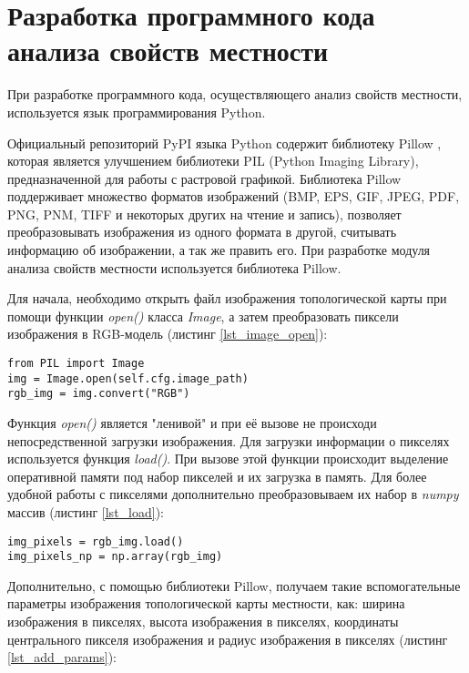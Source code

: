 \section{Разработка программного кода анализа свойств местности}

При разработке программного кода, осуществляющего анализ свойств местности, используется язык программирования Python. 

Официальный репозиторий PyPI языка Python содержит библиотеку Pillow \cite{pillow}, которая является улучшением 
библиотеки PIL (Python Imaging Library), предназначенной для работы с растровой графикой. Библиотека Pillow 
поддерживает множество форматов изображений (BMP, EPS, GIF, JPEG, PDF, PNG, PNM, TIFF и некоторых других на чтение и 
запись), позволяет преобразовывать изображения из одного формата в другой, считывать информацию об изображении, а так 
же править его. При разработке модуля анализа свойств местности используется библиотека Pillow.

Для начала, необходимо открыть файл изображения топологической карты при помощи функции \textit{open()} класса 
\textit{Image}, а затем преобразовать пиксели изображения в RGB-модель (листинг \ref{lst_image_open}):

\begin{lstlisting}[caption=Открытие изображения топологической карты., label={lst_image_open}]
from PIL import Image
img = Image.open(self.cfg.image_path)
rgb_img = img.convert("RGB")
\end{lstlisting}

Функция \textit{open()} является "ленивой" и при её вызове не происходи непосредственной загрузки изображения. Для 
загрузки информации о пикселях используется функция \textit{load()}. При вызове этой функции происходит выделение 
оперативной памяти под набор пикселей и их загрузка в память. Для более удобной работы с пикселями дополнительно 
преобразовываем их набор в \textit{numpy} массив (листинг \ref{lst_load}):

\begin{lstlisting}[caption=Загрузка информации о пикселях изображения., label={lst_load}]
img_pixels = rgb_img.load()
img_pixels_np = np.array(rgb_img)
\end{lstlisting}

Дополнительно, с помощью библиотеки Pillow, получаем такие вспомогательные параметры изображения топологической карты 
местности, как: ширина изображения в пикселях, высота изображения в пикселях, координаты центрального пикселя изображения 
и радиус изображения в пикселях (листинг \ref{lst_add_params}):

